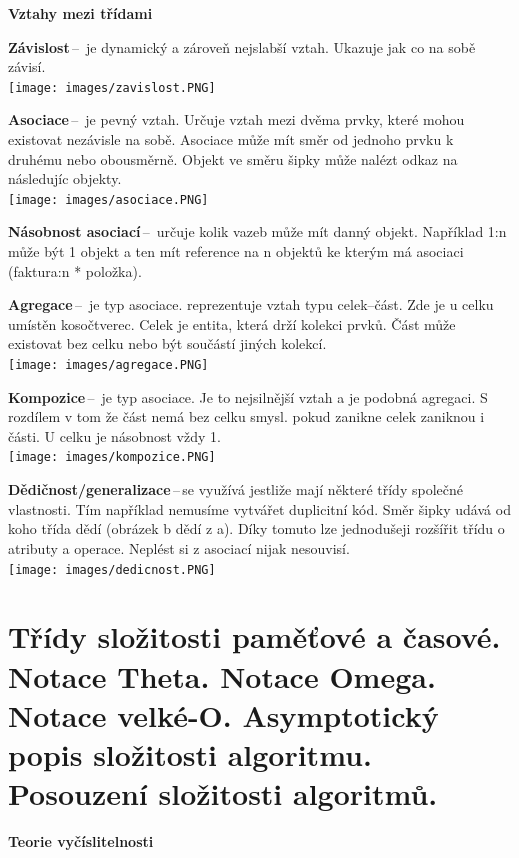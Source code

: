 \begin{Large}\vspace{0,5cm} \textbf{Vztahy mezi třídami}
\end{Large}

\textbf{Závislost}\,--\, je dynamický a zároveň nejslabší vztah. Ukazuje jak co na sobě závisí.\\
\texttt{[image: images/zavislost.PNG]}

\textbf{Asociace}\,--\, je pevný vztah. Určuje vztah mezi dvěma prvky, které mohou existovat nezávisle na sobě. Asociace může mít směr od jednoho prvku k druhému nebo obousměrně. Objekt ve směru šipky může nalézt odkaz na následujíc objekty. \\
\texttt{[image: images/asociace.PNG]}

\textbf{Násobnost asociací}\,--\, určuje kolik vazeb může mít danný objekt. Například 1:n může být 1 objekt a ten mít reference na n objektů ke kterým má asociaci (faktura:n * položka).

\textbf{Agregace}\,--\, je typ asociace. reprezentuje vztah typu celek--část. Zde je u celku umístěn kosočtverec. Celek je entita, která drží kolekci prvků. Část může existovat bez celku nebo být součástí jiných kolekcí. \\\texttt{[image: images/agregace.PNG]}

\textbf{Kompozice}\,--\, je typ asociace. Je to nejsilnější vztah a je podobná agregaci. S rozdílem v tom že část nemá bez celku smysl. pokud zanikne celek zaniknou i části. U celku je násobnost vždy 1.\\ \texttt{[image: images/kompozice.PNG]}

\textbf{Dědičnost/generalizace}\,--\,se využívá jestliže mají některé třídy společné vlastnosti. Tím například nemusíme vytvářet duplicitní kód. Směr šipky udává od koho třída dědí (obrázek b dědí z a). Díky tomuto lze jednodušeji rozšířit třídu o atributy a operace. Neplést si z asociací nijak nesouvisí.\\
\texttt{[image: images/dedicnost.PNG]}










\newpage
\section{Třídy složitosti paměťové a časové. Notace Theta. Notace Omega. Notace velké-O. Asymptotický popis složitosti algoritmu. Posouzení složitosti algoritmů.}
\begin{Large}\vspace{0,5cm} \textbf{Teorie vyčíslitelnosti}
\end{Large}

